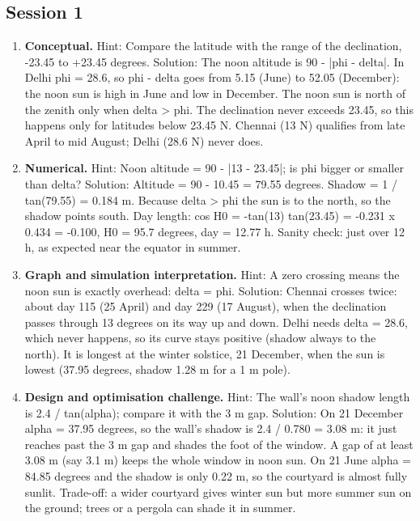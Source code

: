 \documentclass[11pt,a4paper]{article}
\begin{document}
\subsection*{Session 1}
\begin{enumerate}[nosep]
\item \textbf{Conceptual.} Hint: Compare the latitude with the range of the declination, -23.45 to +23.45 degrees. Solution: The noon altitude is 90 - |phi - delta|. In Delhi phi = 28.6, so phi - delta goes from 5.15 (June) to 52.05 (December): the noon sun is high in June and low in December. The noon sun is north of the zenith only when delta > phi. The declination never exceeds 23.45, so this happens only for latitudes below 23.45 N. Chennai (13 N) qualifies from late April to mid August; Delhi (28.6 N) never does.
\item \textbf{Numerical.} Hint: Noon altitude = 90 - |13 - 23.45|; is phi bigger or smaller than delta? Solution: Altitude = 90 - 10.45 = 79.55 degrees. Shadow = 1 / tan(79.55) = 0.184 m. Because delta > phi the sun is to the north, so the shadow points south. Day length: cos H0 = -tan(13) tan(23.45) = -0.231 x 0.434 = -0.100, H0 = 95.7 degrees, day = 12.77 h. Sanity check: just over 12 h, as expected near the equator in summer.
\item \textbf{Graph and simulation interpretation.} Hint: A zero crossing means the noon sun is exactly overhead: delta = phi. Solution: Chennai crosses twice: about day 115 (25 April) and day 229 (17 August), when the declination passes through 13 degrees on its way up and down. Delhi needs delta = 28.6, which never happens, so its curve stays positive (shadow always to the north). It is longest at the winter solstice, 21 December, when the sun is lowest (37.95 degrees, shadow 1.28 m for a 1 m pole).
\item \textbf{Design and optimisation challenge.} Hint: The wall's noon shadow length is 2.4 / tan(alpha); compare it with the 3 m gap. Solution: On 21 December alpha = 37.95 degrees, so the wall's shadow is 2.4 / 0.780 = 3.08 m: it just reaches past the 3 m gap and shades the foot of the window. A gap of at least 3.08 m (say 3.1 m) keeps the whole window in noon sun. On 21 June alpha = 84.85 degrees and the shadow is only 0.22 m, so the courtyard is almost fully sunlit. Trade-off: a wider courtyard gives winter sun but more summer sun on the ground; trees or a pergola can shade it in summer.
\end{enumerate}
\end{document}
